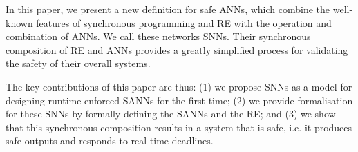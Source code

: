 
In this paper, we present a new definition for safe \acp{ANN}, which combine the well-known features of synchronous programming and \ac{RE} with the operation and combination of \acp{ANN}.
We call these networks \acp{SNN}. 
Their synchronous composition of \ac{RE} and \acp{ANN} provides a greatly simplified process for validating the safety of their overall systems.

The key contributions of this paper are thus: (1) we propose \acp{SNN} as a model for designing runtime enforced \acp{SANN} for the first time; (2) we provide formalisation for these \acp{SNN} by formally defining the \acp{SANN} and the \ac{RE}; and (3) we show that this synchronous composition results in a system that is safe, i.e. it produces safe outputs and responds to real-time deadlines. 




